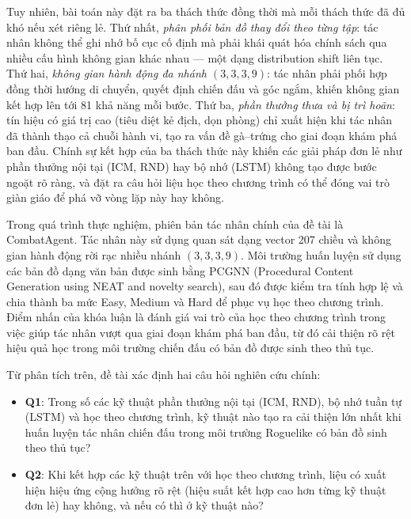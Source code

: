 Tuy nhiên, bài toán này đặt ra ba thách thức đồng thời mà mỗi thách thức đã đủ khó nếu xét riêng lẻ. Thứ nhất, \textit{phân phối bản đồ thay đổi theo từng tập}: tác nhân không thể ghi nhớ bố cục cố định mà phải khái quát hóa chính sách qua nhiều cấu hình không gian khác nhau — một dạng distribution shift liên tục. Thứ hai, \textit{không gian hành động đa nhánh $(3,3,3,9)$}: tác nhân phải phối hợp đồng thời hướng di chuyển, quyết định chiến đấu và góc ngắm, khiến không gian kết hợp lên tới 81 khả năng mỗi bước. Thứ ba, \textit{phần thưởng thưa và bị trì hoãn}: tín hiệu có giá trị cao (tiêu diệt kẻ địch, dọn phòng) chỉ xuất hiện khi tác nhân đã thành thạo cả chuỗi hành vi, tạo ra vấn đề gà–trứng cho giai đoạn khám phá ban đầu. Chính sự kết hợp của ba thách thức này khiến các giải pháp đơn lẻ như phần thưởng nội tại (ICM, RND) hay bộ nhớ (LSTM) không tạo được bước ngoặt rõ ràng, và đặt ra câu hỏi liệu học theo chương trình có thể đóng vai trò giàn giáo để phá vỡ vòng lặp này hay không.

Trong quá trình thực nghiệm, phiên bản tác nhân chính của đề tài là CombatAgent. Tác nhân này sử dụng quan sát dạng vector 207 chiều và không gian hành động rời rạc nhiều nhánh $(3,3,3,9)$. Môi trường huấn luyện sử dụng các bản đồ dạng văn bản được sinh bằng PCGNN (Procedural Content Generation using NEAT and novelty search), sau đó được kiểm tra tính hợp lệ và chia thành ba mức Easy, Medium và Hard để phục vụ học theo chương trình. Điểm nhấn của khóa luận là đánh giá vai trò của học theo chương trình trong việc giúp tác nhân vượt qua giai đoạn khám phá ban đầu, từ đó cải thiện rõ rệt hiệu quả học trong môi trường chiến đấu có bản đồ được sinh theo thủ tục.

\vspace{0.5cm}

Từ phân tích trên, đề tài xác định hai câu hỏi nghiên cứu chính:

\renewcommand{\labelitemi}{$-$}
\begin{itemize}
    \item \textbf{Q1}: Trong số các kỹ thuật phần thưởng nội tại (ICM, RND), bộ nhớ tuần tự (LSTM) và học theo chương trình, kỹ thuật nào tạo ra cải thiện lớn nhất khi huấn luyện tác nhân chiến đấu trong môi trường Roguelike có bản đồ sinh theo thủ tục?
    \item \textbf{Q2}: Khi kết hợp các kỹ thuật trên với học theo chương trình, liệu có xuất hiện hiệu ứng cộng hưởng rõ rệt (hiệu suất kết hợp cao hơn từng kỹ thuật đơn lẻ) hay không, và nếu có thì ở kỹ thuật nào?
\end{itemize}

